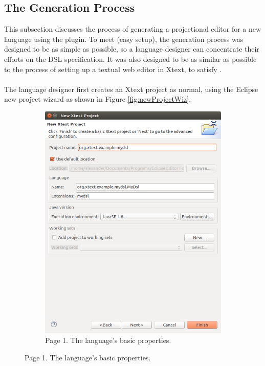 \documentclass{article}
\begin{document}
\subsection{The Generation Process}
This subsection discusses the process of generating a projectional editor for a new language using the plugin. To meet \RSetup (easy setup), the generation process was designed to be as simple as possible, so a language designer can concentrate their efforts on the DSL specification. It was also designed to be as similar as possible to the process of setting up a textual web editor in Xtext, to satisfy \RFamiliarity.
\\
\\
The language designer first creates an Xtext project as normal, using the Eclipse new project wizard as shown in Figure \ref{fig:newProjectWiz},
\begin{figure}[t!]
  \centering
  \begin{subfigure}[b]{0.45\linewidth}
    \includegraphics[width=\linewidth]{./Screenshots/newXtextProject.png}
    \caption{Page 1. The language's basic properties.}

\end{subfigure}
\end{figure}
\end{document}
